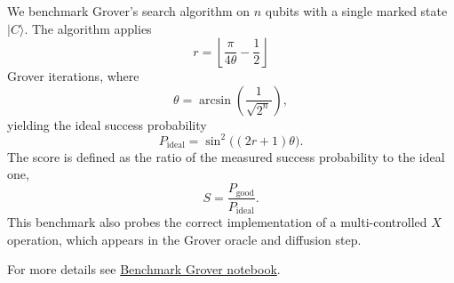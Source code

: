 We benchmark Grover's search algorithm on \(n\) qubits with a single marked state \(|C\rangle\). The algorithm applies
\[
r = \left\lfloor \frac{\pi}{4\theta} - \frac{1}{2} \right\rfloor
\]
Grover iterations, where
\[
\theta = \arcsin\!\left(\frac{1}{\sqrt{2^n}}\right),
\]
yielding the ideal success probability
\[
P_{\mathrm{ideal}} = \sin^2\!\bigl((2r+1)\theta\bigr).
\]
The score is defined as the ratio of the measured success probability to the ideal one,
\[
S = \frac{P_{\mathrm{good}}}{P_{\mathrm{ideal}}}.
\]
This benchmark also probes the correct implementation of a multi-controlled \(X\) operation, which appears in the Grover oracle and diffusion step.
\smallskip

For more details see \href{https://github.com/Classiq/classiq-library/tree/main/benchmarking/benchmarks/benchmark\_grover.ipynb}{Benchmark Grover notebook}.
\medskip

